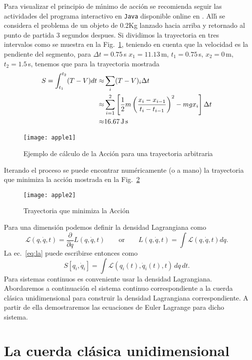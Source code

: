 Para visualizar el principio de m\'\i nimo de acci\'on se recomienda seguir las actividades del programa interactivo en \texttt{Java} disponible online en \cite{JavaAP}. All\'\i{} se considera el problema de un objeto de 0.2Kg lanzado hacia arriba y retornado al punto de partida 3 segundos despues. Si dividimos la trayectoria en tres intervalos como se muestra en la Fig.~\ref{fig:apple1}, teniendo en cuenta que la velocidad es la pendiente del segmento, para $\Delta t=0.75\,$s $x_1=11.13\,$m, $t_1=0.75\,$s, $x_2=0\,$m, $t_2=1.5\,$s, tenemos que para la trayectoria mostrada
\begin{align}
  S=\int_{t_1}^{t_2}(T-V)dt\approx&\sum_i(T-V)_i\Delta t\nonumber\\
  \approx&\sum_{i=1}^2\left[\frac{1}{2}m\left(\frac{x_i-x_{i-1}}{t_i-t_{i-1}}\right)^2-m g x_i\right]\Delta t\nonumber\\
  \approx&16.67\,\text{J\,s}
\end{align}
\begin{figure}
  \centering
  \texttt{[image: apple1]}
  \caption{Ejemplo de c\'alculo de la Acci\'on para una trayectoria arbitraria}
  \label{fig:apple1}
\end{figure}
Iterando el proceso se puede encontrar num\'ericamente (o a mano) la trayectoria que minimiza la acci\'on mostrada en la Fig.~\ref{fig:apple2}
\begin{figure}
  \centering
\texttt{[image: apple2]}
  \caption{Trayectoria que minimiza la Acci\'on}
\label{fig:apple2}
\end{figure}
Para una dimensi\'on podemos definir la densidad Lagrangiana como
\begin{equation}
  \mathcal{L}(q,\dot q,t)=\frac{\partial}{\partial q}L(q,\dot q,t)\qquad\text{or}\qquad L(q,\dot q,t)=\int\mathcal{L}(q,\dot q,t)dq.
\end{equation}
La ec.~\eqref{eq:la} puede escribirse entonces como
\begin{equation}
   S\left[q_i,\dot{q}_i\right] = \int \mathcal{L}(q_i(t), \dot{q}_i(t),t)\, dq\,dt.
\end{equation}
Para sistemas continuos es conveniente usar la densidad Lagrangiana. Abordaremos a continuaci\'on el sistema continuo correspondiente a la cuerda cl\'asica unidimensional para construir la densidad Lagrangiana correspondiente. A partir de ella demostraremos las ecuaciones de Euler Lagrange para dicho sistema.


\section{La cuerda cl\'asica unidimensional}
\label{sec:la-cuerda-clasica}

